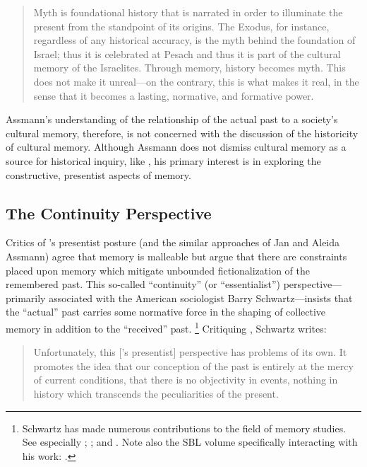 \begin{quote}
    Myth is foundational history that is narrated in order to illuminate the present from the standpoint of its origins. The Exodus, for instance, regardless of any historical accuracy, is the myth behind the foundation of Israel; thus it is celebrated at Pesach and thus it is part of the cultural memory of the Israelites. Through memory, history becomes myth. This does not make it unreal---on the contrary, this is what makes it real, in the sense that it becomes a lasting, normative, and formative power.%
        \autocite[38]{assmann2011}
\end{quote}  
\noindent
Assmann's understanding of the relationship of the actual past to a society's cultural memory, therefore, is not concerned with the discussion of the historicity of cultural memory. Although Assmann does not dismiss cultural memory as a source for historical inquiry, like \halbwachs, his primary interest is in exploring the constructive, presentist aspects of memory.  

\subsection{The Continuity Perspective} 

Critics of \halbwachs's presentist posture (and the similar approaches of Jan and Aleida Assmann) agree that memory is malleable but argue that there are constraints placed upon memory which mitigate unbounded fictionalization of the remembered past. This so-called ``continuity'' (or ``essentialist'') perspective---primarily associated with the American sociologist Barry Schwartz---insists that the ``actual'' past carries some normative force in the shaping of collective memory in addition to the ``received'' past.%
    \footnote{%
        Schwartz has made numerous contributions to the field of memory studies. See especially
        \cite{schwartz_sf1982};
        \cite{schwartz_asr1991}; and
        \cite{schwartz2000}. Note also the SBL volume specifically interacting with his work:
        \cite{thatcher2014}.}
Critiquing \halbwachs, Schwartz writes:  

\begin{quote}
    Unfortunately, this [\halbwachs's presentist] perspective has problems of its own. It promotes the idea that our conception of the past is entirely at the mercy of current conditions, that there is no objectivity in events, nothing in history which transcends the peculiarities of the present.%
        \autocite[376]{schwartz_sf1982}
\end{quote}  

